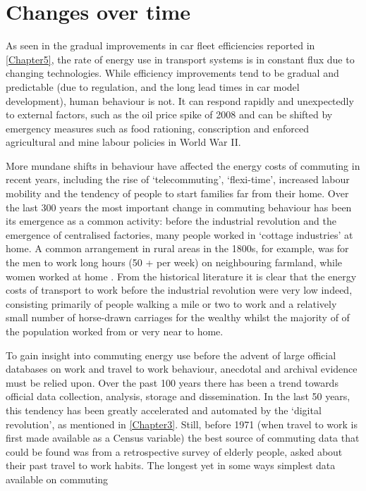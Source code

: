 \section{Changes over time}
As seen in the gradual improvements in car fleet efficiencies reported in
\cref{Chapter5}, the rate of energy use in transport systems is in constant
flux due to changing technologies. While efficiency improvements tend
to be gradual and predictable (due to regulation, and the long lead times
in car model development), human behaviour is not. It can respond rapidly
and unexpectedly to external factors, such as the oil price
spike of 2008 \citep{Sexton2011} and can be shifted
by emergency measures such as food rationing, conscription and
enforced agricultural and mine labour policies in World War II.

More mundane shifts in behaviour have affected the energy costs of commuting
in recent years, including the rise of `telecommuting', `flexi-time', increased
labour mobility and the tendency of people to start families far from their
home. Over the last 300 years the most important change
in commuting behaviour has been its emergence as a common activity:
before the industrial revolution and
the emergence of centralised factories,
many people worked in `cottage industries' at home. A common arrangement in rural
areas in the
1800s, for example, was for the men to work long hours (50 + per week) on
neighbouring farmland, while women worked at home \citep{groves1949sharpen}.
From the historical literature
it is clear that the energy costs of transport to work
before the industrial revolution were very low indeed, consisting primarily of
people walking a mile or two to work and a relatively small number of
horse-drawn carriages for the wealthy whilst the majority of
of the population worked from or very near to home.

To gain insight into commuting energy use before the advent of
large official databases on work and travel to work
behaviour, anecdotal and archival evidence must be relied upon. Over the
past 100 years there has been a trend towards official
data collection, analysis, storage and dissemination. In the last 50 years,
this tendency has been greatly accelerated and automated by the `digital
revolution', as mentioned in \cref{Chapter3}.
Still, before 1971 (when travel to work is first made available as a
Census variable) the best source of commuting data that could be
found was from a retrospective survey of elderly people, asked about their
past travel to work habits. %
The longest yet in some ways simplest data available on commuting


